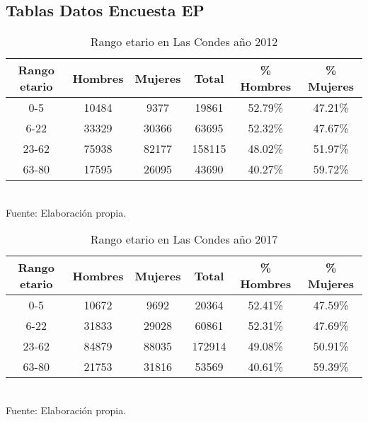\documentclass[12pt]{article} %
\begin{document}
\subsection{Tablas Datos Encuesta EP} \label{sec:Datos_EP}

\begin{table}[H]
    \centering
    \caption{Rango etario en Las Condes año 2012}
    \vspace{0.2cm}
    \begin{tabular}{|c|c|c|c|c|c|}
        \hline
        \textbf{Rango etario} & \textbf{Hombres} & \textbf{Mujeres} & \textbf{Total} & \textbf{\% Hombres} & \textbf{\% Mujeres} \\ \hline
        0-5 & 10484 & 9377 & 19861 & 52.79\% & 47.21\% \\ \hline
        6-22 & 33329 & 30366 & 63695 & 52.32\% & 47.67\% \\ \hline
        23-62 & 75938 & 82177 & 158115 & 48.02\% & 51.97\% \\ \hline
        63-80 & 17595 & 26095 & 43690 & 40.27\% & 59.72\% \\ \hline
    \end{tabular}
    \label{Cuadro 4}
    \vspace{0.2cm}
    \\Fuente: Elaboración propia.
\end{table}

\begin{table}[H]
    \centering
    \caption{Rango etario en Las Condes año 2017}
    \vspace{0.2cm}
    \begin{tabular}{|c|c|c|c|c|c|}
        \hline
        \textbf{Rango etario} & \textbf{Hombres} & \textbf{Mujeres} & \textbf{Total} & \textbf{\% Hombres} & \textbf{\% Mujeres} \\ \hline
        0-5 & 10672 & 9692 & 20364 & 52.41\% & 47.59\% \\ \hline
        6-22 & 31833 & 29028 & 60861 & 52.31\% & 47.69\% \\ \hline
        23-62 & 84879 & 88035 & 172914 & 49.08\% & 50.91\% \\ \hline
        63-80 & 21753 & 31816 & 53569 & 40.61\% & 59.39\% \\ \hline
    \end{tabular}
    \label{Cuadro 5}
    \vspace{0.2cm}
    \\Fuente: Elaboración propia.
\end{table}
\end{document}
